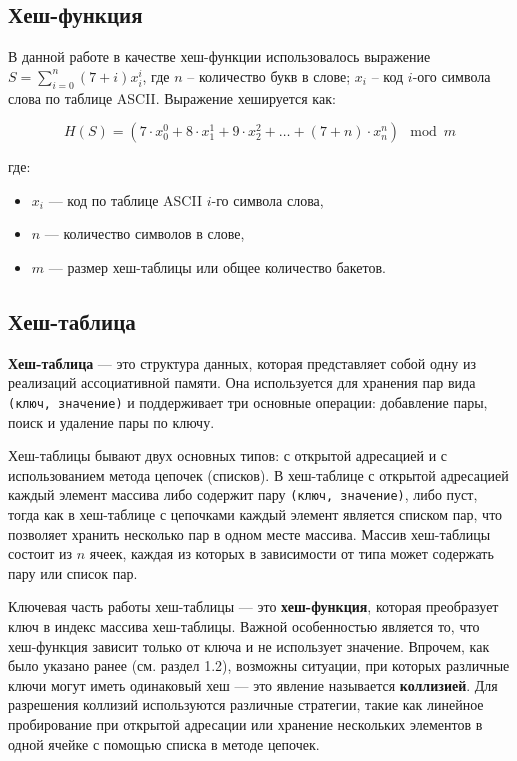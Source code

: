 \documentclass[10pt,a4paper,final]{article} %
\begin{document}
\subsection{Хеш-функция}

В данной работе в качестве хеш-функции использовалось выражение $S = \sum_{i=0}^{n}(7+i)x_{i}^{i}$, где $n$ -- количество букв в слове; $x_i$ -- код $i$-ого символа слова по таблице ASCII. Выражение хешируется как:

\[
H(S) = (7 \cdot x_0^{0} + 8 \cdot x_1^{1} + 9\cdot x_2^{2} +  \ldots  + (7+n) \cdot  x_n^n) \mod m 
\]

где:
\begin{itemize}
	\item $x_i$ — код по таблице ASCII $i$-го символа слова,
	\item $n$ — количество символов в слове,
	\item $m$ — размер хеш-таблицы или общее количество бакетов.
\end{itemize}


\subsection{Хеш-таблица}

\textbf{Хеш-таблица} — это структура данных, которая представляет собой одну из реализаций ассоциативной памяти. Она используется для хранения пар вида \texttt{(ключ, значение)} и поддерживает три основные операции: добавление пары, поиск и удаление пары по ключу.

Хеш-таблицы бывают двух основных типов: с открытой адресацией и с использованием метода цепочек (списков). В хеш-таблице с открытой адресацией каждый элемент массива либо содержит пару \texttt{(ключ, значение)}, либо пуст, тогда как в хеш-таблице с цепочками каждый элемент является списком пар, что позволяет хранить несколько пар в одном месте массива. Массив хеш-таблицы состоит из $n$ ячеек, каждая из которых в зависимости от типа может содержать пару или список пар.

Ключевая часть работы хеш-таблицы — это \textbf{хеш-функция}, которая преобразует ключ в индекс массива хеш-таблицы. Важной особенностью является то, что хеш-функция зависит только от ключа и не использует значение. Впрочем, как было указано ранее (см. раздел 1.2), возможны ситуации, при которых различные ключи могут иметь одинаковый хеш — это явление называется \textbf{коллизией}. Для разрешения коллизий используются различные стратегии, такие как линейное пробирование при открытой адресации или хранение нескольких элементов в одной ячейке с помощью списка в методе цепочек.
\end{document}
